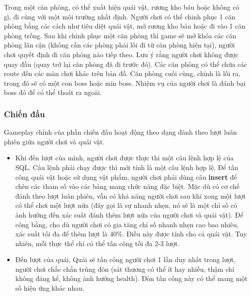 \hspace*{1cm}Trong một căn phòng, có thể xuất hiện quái vật, rương kho báu hoặc không có gì, đi cùng với một môi trường nhất định. Người chơi có thể chinh phục 1 căn phòng bằng các cách như tiêu diệt quái vật, mở rương kho báu hoặc đi vào 1 căn phòng trống. Sau khi chinh phục một căn phòng thì game sẽ mở khóa các căn phòng lân cận (không cần các phòng phải lối đi từ căn phòng hiện tại), người chơi quyết định đi căn phòng nào tiếp theo. Lưu ý rằng người chơi không được quay đầu (quay trở lại căn phòng đã đi trước đó). Các căn phòng có thể chứa các route đến các màn chơi khác trên bản đồ. Căn phòng cuối cùng, chính là lối ra, trong đó sẽ có một con boss hoặc min boss. Nhiệm vụ của người chơi là đánh bại boss đó để có thể thoát ra ngoài.\\
\subsubsection{Chiến đấu}
\hspace*{1cm}Gameplay chính của phần chiến đấu hoạt động theo dạng đánh theo lượt luân phiên giữa người chơi và quái vật.

\begin{itemize}
	\item Khi đến lượt của mình, người chơi được thực thi một câu lệnh hợp lệ của SQL. Câu lệnh phải chạy được thì mới tính là một câu lệnh hợp lệ. Để tấn công quái vật hoặc sử dụng vật phẩm, người chơi phải dùng câu \textbf{insert} để chèn các tham số vào các bảng mang chức năng đặc biệt. Mặc dù có cơ chế đánh theo lượt luân phiên, vẫn có khả năng người chơi sau khi xong một lượt có thể chơi một lượt nữa (đây gọi là sự nhanh nhẹn, nó sẽ là một chỉ số có ảnh hưởng đến xác suất đánh thêm lượt nữa của người chơi và quái vật). Để công bằng, cho dù người chơi có gia tăng chỉ số nhanh nhẹn cao bao nhiêu, xác suất tối đa để thêm lượt là 40\%. Điều này được tính cho cả quái vật. Tuy nhiên, mỗi thực thể chỉ có thể tấn công tối đa 2-3 lượt.
	\item Đến lượt của quái, Quái sẽ tấn công người chơi 1 lần duy nhất trong lượt, người chơi chắc chắn trúng đòn (sát thương có thể ít hay nhiều, thậm chí không đáng kể, không ảnh hưởng health). Đòn tấn công này có thể mang một số hiệu ứng khác nhau.
\end{itemize}

